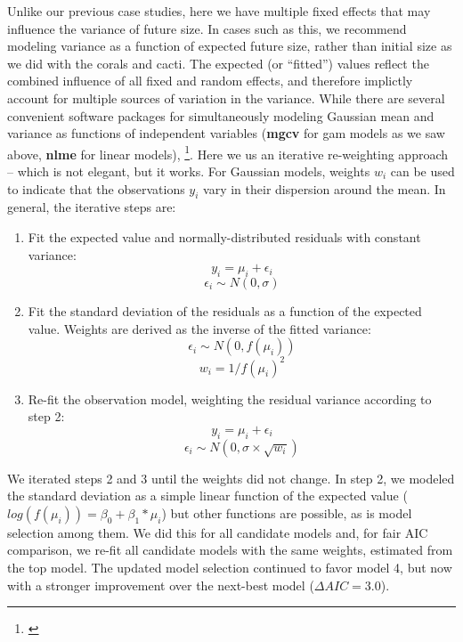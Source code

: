 \documentclass[12pt]{article}
\newcommand{\tom}[2]{{\color{red}{#1}}\footnote{\textit{\color{red}{#2}}}}
\begin{document}
Unlike our previous case studies, here we have multiple fixed effects that may influence the variance of future size. 
In cases such as this, we recommend modeling variance as a function of expected future size, rather than initial size as we did with the corals and cacti. 
The expected (or ``fitted'') values reflect the combined influence of all fixed and random effects, and therefore implictly account for multiple sources of variation in the variance. 
While there are several convenient software packages for simultaneously modeling Gaussian mean and variance as functions of independent variables (\textbf{mgcv} for gam models as we saw above, \textbf{nlme} for linear models), \tom{modeling variance as a function of the mean is trickier because they cannot easily be fit simultaneously}{After I wrote this I discovered that nlme can fit residual variance as a function of fitted(.).}. 
Here we us an iterative re-weighting approach -- which is not elegant, but it works. 
For Gaussian models, weights $w_{i}$ can be used to indicate that the observations $y_{i}$ vary in their dispersion around the mean. 
In general, the iterative steps are: 
\begin{enumerate}
	\item Fit the expected value and normally-distributed residuals with constant variance:
	$$y_{i} = \mu_{i} + \epsilon_{i}$$
	$$\epsilon_{i} \sim N(0,\sigma)$$
	\item Fit the standard deviation of the residuals as a function of the expected value. Weights are derived as the inverse of the fitted variance:
	$$\epsilon_{i} \sim N(0,f(\mu_{i}))$$
	$$w_{i}=1/{f(\mu_{i})^2}$$
	\item Re-fit the observation model, weighting the residual variance according to step 2:
	$$y_{i} = \mu_{i} + \epsilon_{i}$$
	$$\epsilon_{i} \sim N(0,\sigma \times \sqrt{w_{i}})$$	
\end{enumerate}
We iterated steps 2 and 3 until the weights did not change. 
In step 2, we modeled the standard deviation as a simple linear function of the expected value ($log(f(\mu_{i}))=\beta_{0}+\beta_{1}*\mu_{i}$) but other functions are possible, as is model selection among them. 
We did this for all candidate models and, for fair AIC comparison, we re-fit all candidate models with the same weights, estimated from the top model. 
The updated model selection continued to favor model 4, but now with a stronger improvement over the next-best model ($\Delta AIC = 3.0$). 
\end{document}
